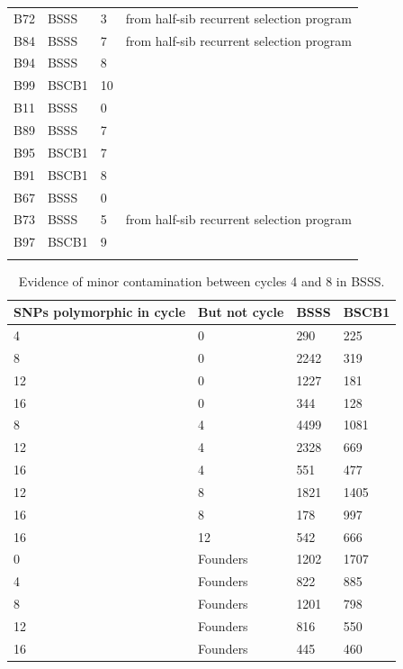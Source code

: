 \begin{table}
\begin{tabular}{ | l | l | l | l | }
	B72 & BSSS & 3 & from half-sib recurrent selection program \\ 
	B84 & BSSS & 7 & from half-sib recurrent selection program \\ 
	B94 & BSSS & 8 &  \\ 
	B99 & BSCB1 & 10 &  \\ 
	B11 & BSSS & 0 &  \\ 
	B89 & BSSS & 7 &  \\ 
	B95 & BSCB1 & 7 &  \\ 
	B91 & BSCB1 & 8 &  \\ 
	B67 & BSSS & 0 &  \\ 
	B73 & BSSS & 5 & from half-sib recurrent selection program \\ 
	B97 & BSCB1 & 9 &  \\ 
	    \label{tab:s1}  %
\end{tabular}
\end{table}
\newpage

\begin{table}
\caption{Evidence of minor contamination between cycles 4 and 8 in BSSS.}
\begin{tabular}{ | l | l | l | l | }
\hline
	\textbf{SNPs polymorphic in cycle} & \textbf{But not cycle} & \textbf{BSSS} & \textbf{BSCB1} \\ \hline
	4 & 0 & 290 & 225 \\ \hline
	8 & 0 & 2242 & 319 \\ \hline
	12 & 0 & 1227 & 181 \\ \hline
	16 & 0 & 344 & 128 \\ \hline
	8 & 4 & 4499 & 1081 \\ \hline
	12 & 4 & 2328 & 669 \\ \hline
	16 & 4 & 551 & 477 \\ \hline
	12 & 8 & 1821 & 1405 \\ \hline
	16 & 8 & 178 & 997 \\ \hline
	16 & 12 & 542 & 666 \\ \hline
	0 & Founders & 1202 & 1707 \\ \hline
	4 & Founders & 822 & 885 \\ \hline
	8 & Founders & 1201 & 798 \\ \hline
	12 & Founders & 816 & 550 \\ \hline
	16 & Founders & 445 & 460 \\ \hline
\end{tabular}
		    \label{tab:s2}  %
\end{table}
\newpage

